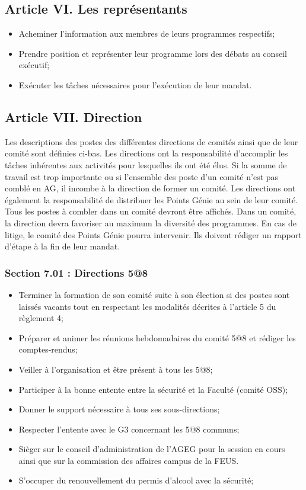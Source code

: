 \subsection*{Article VI. Les représentants}
\begin{itemize}
    \item Acheminer l’information aux membres de leurs programmes respectifs;
    \item Prendre position et représenter leur programme lors des débats au conseil exécutif;
    \item Exécuter les tâches nécessaires pour l’exécution de leur mandat.
\end{itemize}

\subsection*{Article VII. Direction}
Les descriptions des postes des différentes directions de comités ainsi que de leur comité sont définies ci-bas. Les directions ont la responsabilité d'accomplir les tâches inhérentes aux activités pour lesquelles ils ont été élus. Si la somme de travail est trop importante ou si l’ensemble des poste d’un comité n’est pas comblé en AG, il incombe à la direction de former un comité. Les directions ont également la responsabilité de distribuer les Points Génie au sein de leur comité. Tous les postes à combler dans un comité devront être affichés. Dans un comité, la direction devra favoriser au maximum la diversité des programmes. En cas de litige, le comité des Points Génie pourra intervenir. Ils doivent rédiger un rapport d’étape à la fin de leur mandat. 

\subsubsection*{Section 7.01 : Directions 5@8}
\begin{itemize}
    \item Terminer la formation de son comité suite à son élection si des postes sont laissés vacants tout en respectant les modalités décrites à l'article 5 du règlement 4;
    \item Préparer et animer les réunions hebdomadaires du comité 5@8 et rédiger les comptes-rendus;
    \item Veiller à l'organisation et être présent à tous les 5@8;
    \item Participer à la bonne entente entre la sécurité et la Faculté (comité OSS);
    \item Donner le support nécessaire à tous ses sous-directions;
    \item Respecter l'entente avec le G3 concernant les 5@8 communs;
    \item Sièger sur le conseil d'administration de l'AGEG pour la session en cours ainsi que sur la commission des affaires campus de la FEUS.
    \item S’occuper du renouvellement du permis d’alcool avec la sécurité;
\end{itemize}

